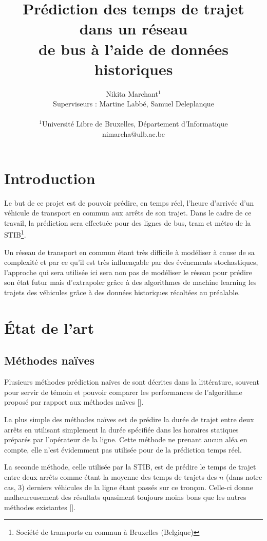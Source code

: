 \documentclass[letterpaper]{article}
\title{Prédiction des temps de trajet dans un réseau\\ de bus à l'aide de données historiques}
\author{Nikita Marchant$^{1}$\\
Superviseurs : Martine Labbé, Samuel Deleplanque
\mbox{}\\\\
$^1$Université Libre de Bruxelles, Département d'Informatique\\
nimarcha@ulb.ac.be}
\begin{document}
\maketitle

\begin{abstract}

\end{abstract}

\section{Introduction}

Le but de ce projet est de pouvoir prédire, en temps réel, l'heure d'arrivée d'un véhicule de transport en commun aux arrêts de son trajet.
Dans le cadre de ce travail, la prédiction sera effectuée pour des lignes de bus,
tram et métro de la STIB\footnote{Société de transports en commun à Bruxelles (Belgique)}.

Un réseau de transport en commun étant très difficile à modéliser à cause de sa complexité et par ce qu'il est très influençable par des événements stochastiques,
l'approche qui sera utilisée ici sera non pas de modéliser le réseau pour prédire son état futur mais d'extrapoler grâce à des algorithmes de machine learning les trajets des véhicules grâce à des données historiques récoltées au préalable.

\section{État de l'art}

\subsection{Méthodes naïves}

Plusieurs méthodes prédiction naïves de sont décrites dans la littérature, souvent pour servir de témoin et pouvoir comparer les performances de l'algorithme proposé par rapport aux méthodes naïves [\cite{Altinkaya2013}].

La plus simple des méthodes naïves est de prédire la durée de trajet entre deux arrêts en utilisant simplement la durée spécifiée dans les horaires statiques préparés par l'opérateur de la ligne. Cette méthode ne prenant aucun aléa en compte, elle n'est évidemment pas utilisée pour de la prédiction temps réel.

La seconde méthode, celle utilisée par la STIB, est de prédire le temps de trajet entre deux arrêts comme étant la moyenne des temps de trajets des $n$ (dans notre cas, 3) derniers véhicules de la ligne étant passés sur ce tronçon. Celle-ci donne malheureusement des résultats quasiment toujours moins bons que les autres méthodes existantes [\cite{Altinkaya2013}].
\end{document}
